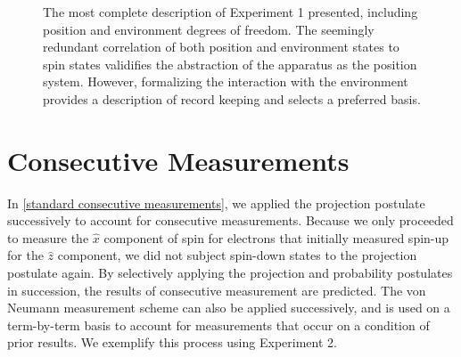 \begin{figure}
\centering\CaptionFontSize
{}
\caption[Unitary measurement for Stern-Gerlach Experiment 1, including the electron-environment interaction]
{The most complete description of Experiment 1 presented, including position and environment degrees of freedom. The seemingly redundant correlation of both position and environment states to spin states validifies the abstraction of the apparatus as the position system. However, formalizing the interaction with the environment provides a description of record keeping and selects a preferred basis.}
\label{fig: Experiment 1 inselection}
\end{figure}

\section{Consecutive Measurements}

In \autoref{standard consecutive measurements}, we applied the projection postulate successively to account for consecutive measurements. Because we only proceeded to measure the $\hat{x}$ component of spin for electrons that initially measured spin-up for the $\hat{z}$ component, we did not subject spin-down states to the projection postulate again. By selectively applying the projection and probability postulates in succession, the results of consecutive measurement are predicted. The von Neumann measurement scheme can also be applied successively, and is used on a term-by-term basis to account for measurements that occur on a condition of prior results. We exemplify this process using Experiment 2.

